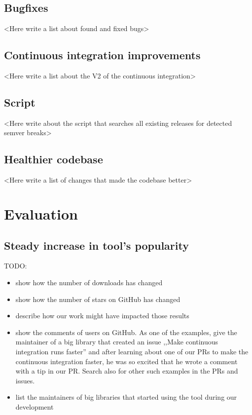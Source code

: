 \documentclass[licencjacka,en]{pracamgr}
\begin{document}
\section{Bugfixes}

<Here write a list about found and fixed bugs>

\section{Continuous integration improvements}

<Here write a list about the V2 of the continuous integration>

\section{Script}

<Here write about the script that searches all existing releases for detected semver breaks>

\section{Healthier codebase}

<Here write a list of changes that made the codebase better>

\chapter{Evaluation}\label{r:chapter_evaluation}

\section{Steady increase in tool's popularity}

TODO:
\begin{itemize}
	\item show how the number of downloads has changed
	\item show how the number of stars on GitHub has changed
	\item describe how our work might have impacted those results
	\item show the comments of users on GitHub.
		As one of the examples, give the maintainer of a big
		library that created an issue ,,Make continuous integration runs faster''
		and after learning about one of our PRs to make the continuous integration faster,
		he was so excited that he wrote a comment with a tip in our PR.
		Search also for other such examples in the PRs and issues.
	\item list the maintainers of big libraries that started using the tool during our development
\end{itemize}
\end{document}
